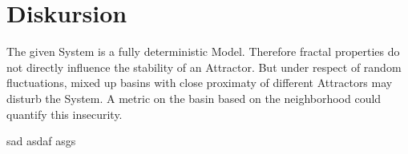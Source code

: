 \documentclass[a4paper,12pt, twoside]{article} %
\begin{document}
\section{Diskursion}

The given System is a fully deterministic Model. Therefore fractal properties do not directly influence 
the stability of an Attractor. But under respect of random fluctuations, mixed up basins with close proximaty 
of different Attractors may disturb the System. A metric on the basin based on the neighborhood could quantify this
insecurity. 

sad\autocite{paper}
asdaf\autocite{biodiversity}
asgs\autocite{hassell}

\newpage
\thispagestyle{justline}
\printbibliography[]
\end{document}
